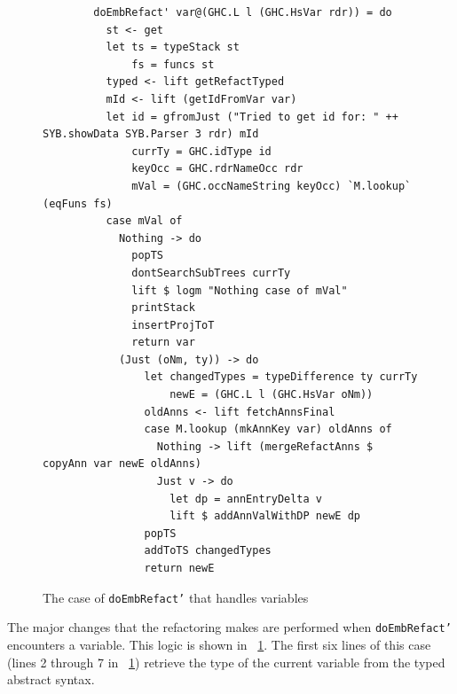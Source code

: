 \begin{figure}[!t]
\begin{lstlisting}
        doEmbRefact' var@(GHC.L l (GHC.HsVar rdr)) = do
          st <- get          
          let ts = typeStack st
              fs = funcs st              
          typed <- lift getRefactTyped
          mId <- lift (getIdFromVar var)
          let id = gfromJust ("Tried to get id for: " ++ SYB.showData SYB.Parser 3 rdr) mId
              currTy = GHC.idType id
              keyOcc = GHC.rdrNameOcc rdr
              mVal = (GHC.occNameString keyOcc) `M.lookup` (eqFuns fs)
          case mVal of
            Nothing -> do
              popTS
              dontSearchSubTrees currTy
              lift $ logm "Nothing case of mVal"
              printStack
              insertProjToT
              return var
            (Just (oNm, ty)) -> do
                let changedTypes = typeDifference ty currTy
                    newE = (GHC.L l (GHC.HsVar oNm))
                oldAnns <- lift fetchAnnsFinal
                case M.lookup (mkAnnKey var) oldAnns of
                  Nothing -> lift (mergeRefactAnns $ copyAnn var newE oldAnns)
                  Just v -> do
                    let dp = annEntryDelta v
                    lift $ addAnnValWithDP newE dp
                popTS
                addToTS changedTypes                
                return newE
\end{lstlisting}
\caption{The case of \texttt{doEmbRefact'} that handles variables}
\label{embRefactVar}
\end{figure}

The major changes that the refactoring makes are performed when \texttt{doEmbRefact'} encounters a variable. This logic is shown in \DIFdelbegin {}\DIFdelend \DIFaddbegin {}\DIFaddend ~\ref{embRefactVar}. The first six lines of this case (lines 2 through 7 in \DIFdelbegin {}\DIFdelend \DIFaddbegin {}\DIFaddend ~\ref{embRefactVar}) retrieve the type of the current variable from the typed abstract syntax. 

